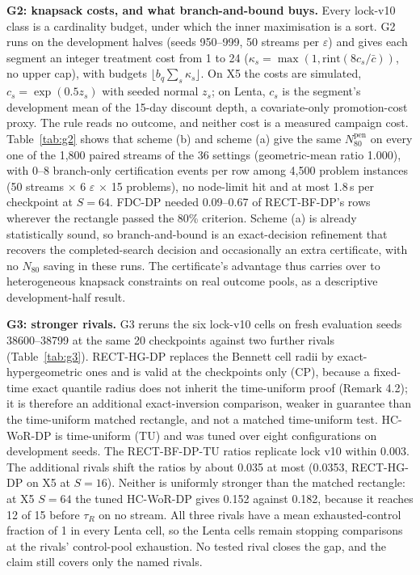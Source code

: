 \documentclass[sigconf,anonymous,review]{acmart}
\newcommand{\eps}{\varepsilon}
\newcommand{\Npen}{N_{80}^{\text{pen}}}
\begin{document}
\textbf{G2: knapsack costs, and what branch-and-bound buys.} Every lock-v10 class is a cardinality budget, under which the inner maximisation is a sort. G2 runs on the development halves (seeds 950--999, 50 streams per $\eps$) and gives each segment an integer treatment cost from 1 to 24 ($\kappa_s = \max(1, \mathrm{rint}(8 c_s/\bar c))$, no upper cap), with budgets $\lfloor b_q \sum_s \kappa_s \rfloor$. On X5 the costs are simulated, $c_s = \exp(0.5 z_s)$ with seeded normal $z_s$; on Lenta, $c_s$ is the segment's development mean of the 15-day discount depth, a covariate-only promotion-cost proxy. The rule reads no outcome, and neither cost is a measured campaign cost. Table~\ref{tab:g2} shows that scheme (b) and scheme (a) give the same $\Npen$ on every one of the 1,800 paired streams of the 36 settings (geometric-mean ratio 1.000), with 0--8 branch-only certification events per row among 4,500 problem instances (50 streams $\times$ 6 $\eps$ $\times$ 15 problems), no node-limit hit and at most 1.8\,s per checkpoint at $S = 64$. FDC-DP needed 0.09--0.67 of RECT-BF-DP's rows wherever the rectangle passed the 80\% criterion. Scheme (a) is already statistically sound, so branch-and-bound is an exact-decision refinement that recovers the completed-search decision and occasionally an extra certificate, with no $N_{80}$ saving in these runs. The certificate's advantage thus carries over to heterogeneous knapsack constraints on real outcome pools, as a descriptive development-half result.



\textbf{G3: stronger rivals.} G3 reruns the six lock-v10 cells on fresh evaluation seeds 38600--38799 at the same 20 checkpoints against two further rivals (Table~\ref{tab:g3}). RECT-HG-DP replaces the Bennett cell radii by exact-hypergeometric ones and is valid at the checkpoints only (CP), because a fixed-time exact quantile radius does not inherit the time-uniform proof (Remark 4.2); it is therefore an additional exact-inversion comparison, weaker in guarantee than the time-uniform matched rectangle, and not a matched time-uniform test. HC-WoR-DP is time-uniform (TU) and was tuned over eight configurations on development seeds. The RECT-BF-DP-TU ratios replicate lock v10 within 0.003. The additional rivals shift the ratios by about 0.035 at most (0.0353, RECT-HG-DP on X5 at $S = 16$). Neither is uniformly stronger than the matched rectangle: at X5 $S = 64$ the tuned HC-WoR-DP gives 0.152 against 0.182, because it reaches 12 of 15 before $\tau_R$ on no stream. All three rivals have a mean exhausted-control fraction of 1 in every Lenta cell, so the Lenta cells remain stopping comparisons at the rivals' control-pool exhaustion. No tested rival closes the gap, and the claim still covers only the named rivals.
\end{document}

